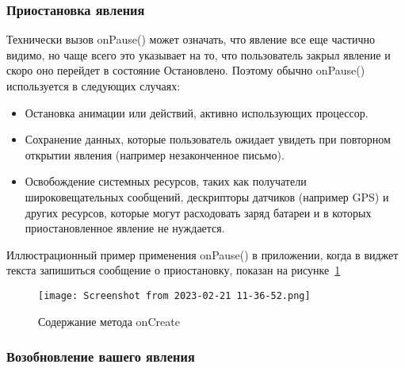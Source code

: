 \subsubsection{Приостановка явления}
Технически вызов onPause() может означать, что явление все еще частично
видимо, но чаще всего это указывает на то, что пользователь закрыл явление 
и скоро оно перейдет в состояние Остановлено. Поэтому обычно onPause()
используется в следующих случаях:
\begin{itemize}
	\item Остановка анимации или действий, активно использующих процессор.
	\item Сохранение данных, которые пользователь ожидает увидеть при
		повторном открытии явления (например незаконченное письмо).
	\item Освобождение системных ресурсов, таких как получатели
		широковещательных сообщений, дескрипторы датчиков (например GPS)
		и других ресурсов, которые могут расходовать заряд батареи
		и в которых приостановленное явление не нуждается.
\end{itemize}
Иллюстрационный пример применения onPause() в приложении,
когда в виджет текста запишиться сообщение о приостановку, показан
на рисунке~\ref{fig:activity:onPause:content}
\begin{figure}[h!tp]
	\centering
	\texttt{[image: Screenshot from 2023-02-21 11-36-52.png]}
	\caption{Содержание метода onCreate}
	\label{fig:activity:onPause:content}
\end{figure}

\subsubsection{Возобновление вашего явления}

